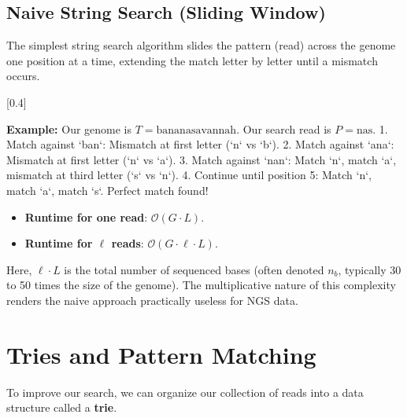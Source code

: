 \subsection{Naive String Search (Sliding Window)}

The simplest string search algorithm slides the pattern (read) across the genome one position at a time, extending the match letter by letter until a mismatch occurs.


[0.4]


\textbf{Example:}
Our genome is \(T = \text{bananasavannah}\). Our search read is \(P = \text{nas}\).
1. Match against `ban`: Mismatch at first letter (`n` vs `b`).
2. Match against `ana`: Mismatch at first letter (`n` vs `a`).
3. Match against `nan`: Match `n`, match `a`, mismatch at third letter (`s` vs `n`).
4. Continue until position 5: Match `n`, match `a`, match `s`. Perfect match found!

\begin{itemize}
    \item \textbf{Runtime for one read}: $\mathcal{O}(G \cdot L)$.
    \item \textbf{Runtime for $\ell$ reads}: $\mathcal{O}(G \cdot \ell \cdot L)$.
\end{itemize}

Here, $\ell \cdot L$ is the total number of sequenced bases (often denoted \(n_b\), typically 30 to 50 times the size of the genome). The multiplicative nature of this complexity renders the naive approach practically useless for NGS data.

\section{Tries and Pattern Matching}

To improve our search, we can organize our collection of reads into a data structure called a \textbf{trie}.

